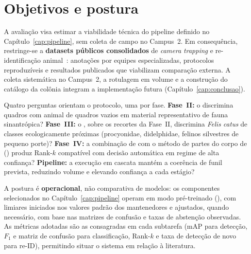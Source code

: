 \section{Objetivos e postura}
\label{sec:metodologia-visao-geral}

A avaliação visa estimar a viabilidade técnica do pipeline definido no Capítulo~\ref{cap:pipeline}, sem coleta de campo no Campus~2. Em consequência, restringe-se a \textbf{datasets públicos consolidados} de \emph{camera trapping} e re-identificação animal~\cite{beery2018terra,tabak2019nacti,norouzzadeh2018automatically,shinoda2024petface,adam2024wildlifereid10k}: anotações por equipes especializadas, protocolos reproduzíveis e resultados publicados que viabilizam comparação externa. A coleta sistemática no Campus~2, a rotulagem em volume e a construção do catálogo da colônia integram a implementação futura (Capítulo~\ref{cap:conclusao}).

Quatro perguntas orientam o protocolo, uma por fase. \textbf{Fase~II:} o \modeloMD{} discrimina quadros com animal de quadros vazios em material representativo de fauna sinantrópica? \textbf{Fase~III:} o \modeloSN{}, sobre os recortes da Fase~II, discrimina \emph{Felis catus} de classes ecologicamente próximas (procyonidae, didelphidae, felinos silvestres de pequeno porte)? \textbf{Fase~IV:} a combinação de \modeloPetFace{} com o método de partes do corpo de \citeauthor{akbar2025bodypart} (\citeyear{akbar2025bodypart}) produz Rank-$k$ compatível com decisão automática em regime de alta confiança? \textbf{Pipeline:} a execução em cascata mantém a coerência de funil prevista, reduzindo volume e elevando confiança a cada estágio?

A postura é \textbf{operacional}, não comparativa de modelos: os componentes selecionados no Capítulo~\ref{cap:pipeline} operam em modo pré-treinado (), com limiares iniciados nos valores padrão dos mantenedores e ajustados, quando necessário, com base nas matrizes de confusão e taxas de abstenção observadas. As métricas adotadas são as consagradas em cada subtarefa (mAP para detecção, $F_1$ e matriz de confusão para classificação, Rank-$k$ e taxa de detecção de novo para re-ID), permitindo situar o sistema em relação à literatura.

